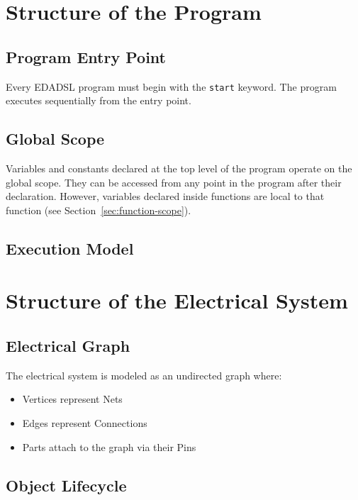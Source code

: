 \documentclass{report}
\begin{document}
\chapter{Structure of the Program}

\section{Program Entry Point}
Every EDADSL program must begin with the \texttt{start} keyword. The program executes sequentially from the entry point.

\section{Global Scope}
Variables and constants declared at the top level of the program operate on the global scope. They can be accessed from any point in the program after their declaration. However, variables declared inside functions are local to that function (see Section~\ref{sec:function-scope}).

\section{Execution Model}


\chapter{Structure of the Electrical System}

\section{Electrical Graph}
The electrical system is modeled as an undirected graph where:
\begin{itemize}
\item Vertices represent Nets
\item Edges represent Connections
\item Parts attach to the graph via their Pins
\end{itemize}

\section{Object Lifecycle}
\end{document}

